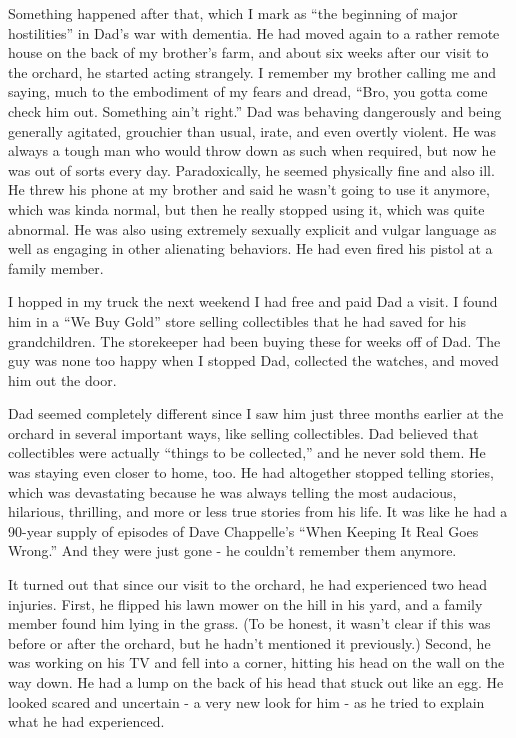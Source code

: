 \documentclass{article}
\begin{document}
Something happened after that, which I mark as ``the beginning of major hostilities'' in Dad's war with dementia. He had moved again to a rather remote house on the back of my brother's farm, and about six weeks after our visit to the orchard, he started acting strangely. I remember my brother calling me and saying, much to the embodiment of my fears and dread, ``Bro, you gotta come check him out. Something ain't right.'' Dad was behaving dangerously and being generally agitated, grouchier than usual, irate, and even overtly violent. He was always a tough man who would throw down as such when required, but now he was out of sorts every day. Paradoxically, he seemed physically fine and also ill. He threw his phone at my brother and said he wasn't going to use it anymore, which was kinda normal, but then he really stopped using it, which was quite abnormal. He was also using extremely sexually explicit and vulgar language as well as engaging in other alienating behaviors. He had even fired his pistol at a family member.

I hopped in my truck the next weekend I had free and paid Dad a visit. I found him in a ``We Buy Gold'' store selling collectibles that he had saved for his grandchildren. The storekeeper had been buying these for weeks off of Dad. The guy was none too happy when I stopped Dad, collected the watches, and moved him out the door.

Dad seemed completely different since I saw him just three months earlier at the orchard in several important ways, like selling collectibles. Dad believed that collectibles were actually ``things to be collected,'' and he never sold them. He was staying even closer to home, too. He had altogether stopped telling stories, which was devastating because he was always telling the most audacious, hilarious, thrilling, and more or less true stories from his life. It was like he had a 90-year supply of episodes of Dave Chappelle's ``When Keeping It Real Goes Wrong.'' And they were just gone - he couldn't remember them anymore.

It turned out that since our visit to the orchard, he had experienced two head injuries. First, he flipped his lawn mower on the hill in his yard, and a family member found him lying in the grass. (To be honest, it wasn't clear if this was before or after the orchard, but he hadn't mentioned it previously.) Second, he was working on his TV and fell into a corner, hitting his head on the wall on the way down. He had a lump on the back of his head that stuck out like an egg. He looked scared and uncertain - a very new look for him - as he tried to explain what he had experienced. 
\end{document}
